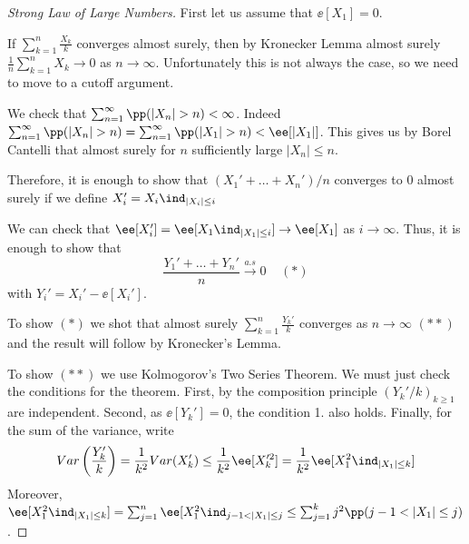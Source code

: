 \documentclass[../main.tex]{subfiles}
\begin{document}
   \begin{proof}
     [Strong Law of Large Numbers]
     \hfill

     \vspace{0.5em}

     First let us assume that $\ee[X_1] = 0$.
     \vspace{0.5em}

     If $\sum_{k=1}^n \frac{X_k}{k} $ converges almost surely, then by
     Kronecker Lemma almost surely $\frac{1}{n} \sum_{k=1}^n X_k \to 0 $ as $n
     \to \infty$. Unfortunately this is not always the case, so we need to
     move to a cutoff argument.

     \vspace{0.5em}
     
     We check that $\sum_{n=1}^\infty \pp(|X_n| > n) < \infty$. Indeed 
     $\sum_{n = 1}^\infty \pp(|X_n| > n) = \sum_{n=1}^\infty \pp(|X_1| > n) <
     \ee[|X_1|]$. This gives us by Borel Cantelli that almost surely for $n$
     sufficiently large $|X_n| \leq n$. 

     \vspace{0.5em}

     Therefore, it is enough to show that $(X_1' + \ldots + X_n')/n$ converges
     to $0$ almost surely if we define $X_i' = X_i \ind_{|X_i| \leq i}$

     \vspace{0.5em}

     We can check that $\ee[X_i'] = \ee[X_1 \ind_{|X_1| \leq i}] \to \ee[X_1]$
     as $i \to \infty$. Thus, it is enough to show that 
     \[
       \frac{Y_1' + \ldots + Y_n'}{n} \overset{a.s}{\longrightarrow} 0
       \;\;\;\;(\ast)
     \] 
     with $Y_i' = X_i' - \ee[X_i']$.

     \vspace{0.5em}

     To show $(\ast)$ we shot that almost surely $\sum_{k=1}^n \frac{Y_k'}{k}
     $ converges as $n \to \infty$ $(\ast\ast)$ and the result will follow by
     Kronecker's Lemma.

     \vspace{0.5em}

     To show $(\ast\ast)$ we use Kolmogorov's Two Series Theorem. We must just
     check the conditions for the theorem. First, by the composition principle
     $(Y_k'/k)_{k \geq 1}$ are independent. Second, as $\ee[Y_k'] = 0$, the
     condition 1. also holds. Finally, for the sum of the variance, write 
     \[
       Var \left( \frac{Y_k'}{k}  \right) = \frac{1}{k^2} Var(X_k')
       \leq \frac{1}{k^2} \ee[X_k'^2] = \frac{1}{k^2} \ee[X_1^2 \ind_{|X_1| \leq
       k}] 
     \] 
     Moreover, $\ee[X_1^2 \ind_{|X_1| \leq k}] = \sum_{j=1}^n \ee[X_1^2
     \ind_{j-1 < |X_1| \leq j} \leq \sum_{j=1}^k j^2 \pp(j-1 < |X_1| \leq j)$.


\end{proof}
\end{document}
